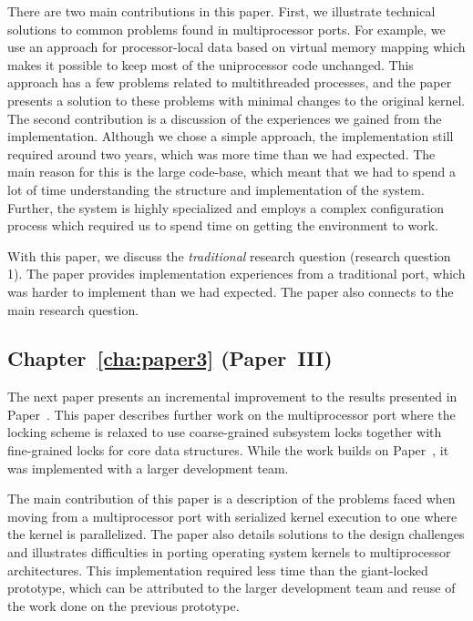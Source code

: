 There are two main contributions in this paper.  First, we illustrate
technical solutions to common problems found in multiprocessor ports.
For example, we use an approach for processor-local data based on virtual
memory mapping which makes it possible to keep most of the uniprocessor code
unchanged. This approach has a few problems related to multithreaded
processes, and the paper presents a solution to these problems with minimal
changes to the original kernel. The second contribution is a discussion of the
experiences we gained from the implementation. Although we chose a simple
approach, the implementation still required around two years, which was more
time than we had expected.  The main reason for this is the large code-base,
which meant that we had to spend a lot of time understanding the structure
and implementation of the system. Further, the system is highly specialized
and employs a complex configuration process which required us to spend time on
getting the environment to work.

With this paper, we discuss the \emph{traditional} research question (research
question 1).  The paper provides implementation experiences from a traditional
port, which was harder to implement than we had expected. The paper also
connects to the main research question.

\subsection{Chapter~\ref{cha:paper3} (Paper~III)}
The next paper presents an incremental improvement to the results presented in
Paper~. This paper describes further work on the
multiprocessor port where the locking scheme is relaxed to use coarse-grained
subsystem locks together with fine-grained locks for core data structures.
While the work builds on Paper~, it was implemented
with a larger development team.

The main contribution of this paper is a description of the problems faced
when moving from a multiprocessor port with serialized kernel execution to one
where the kernel is parallelized. The paper also details solutions to the
design challenges and illustrates difficulties in porting operating system
kernels to multiprocessor architectures. This implementation required less
time than the giant-locked prototype, which can be attributed to the larger
development team and reuse of the work done on the previous prototype.

